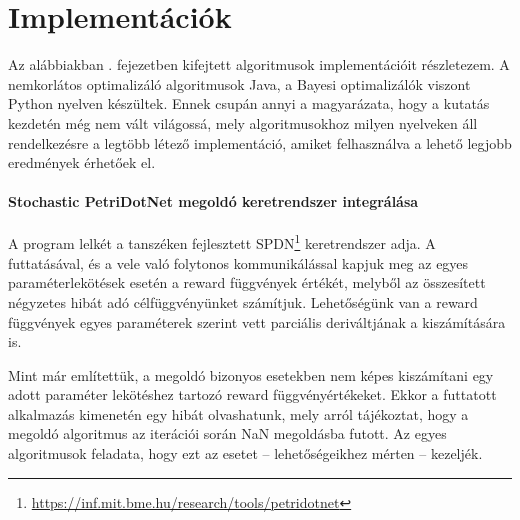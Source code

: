 \chapter{Implementációk}
\label{sec:implementaciok}
Az alábbiakban . fejezetben kifejtett algoritmusok implementációit részletezem. A nemkorlátos optimalizáló algoritmusok Java, a Bayesi optimalizálók viszont Python nyelven készültek. Ennek csupán annyi a magyarázata, hogy a kutatás kezdetén még nem vált világossá, mely algoritmusokhoz milyen nyelveken áll rendelkezésre a legtöbb létező implementáció, amiket felhasználva a lehető legjobb eredmények érhetőek el.

\subsubsection{Stochastic PetriDotNet megoldó keretrendszer integrálása}
A program lelkét a tanszéken fejlesztett SPDN\footnote{\url{https://inf.mit.bme.hu/research/tools/petridotnet}} %
keretrendszer adja. A futtatásával, és a vele való folytonos kommunikálással kapjuk meg az egyes paraméterlekötések esetén a reward függvények értékét, melyből az összesített négyzetes hibát adó célfüggvényünket számítjuk. Lehetőségünk van a reward függvények egyes paraméterek szerint vett parciális deriváltjának a kiszámítására is.

Mint már említettük, a megoldó bizonyos esetekben nem képes kiszámítani egy adott paraméter lekötéshez tartozó reward függvényértékeket. Ekkor a futtatott alkalmazás kimenetén egy hibát olvashatunk, mely arról tájékoztat, hogy a megoldó algoritmus az iterációi során NaN megoldásba futott. Az egyes algoritmusok feladata, hogy ezt az esetet -- lehetőségeikhez mérten -- kezeljék.

